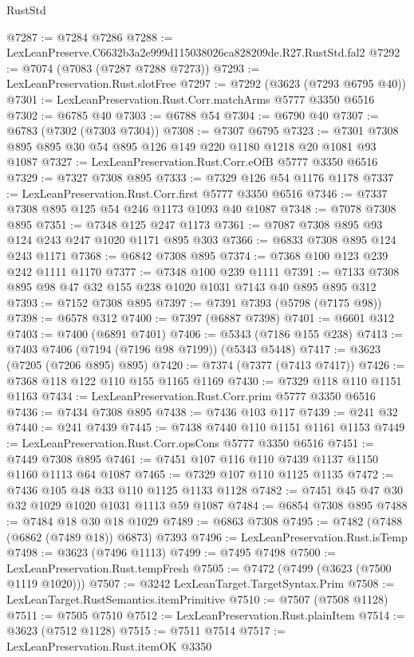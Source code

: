 \begin{lexlean}{RustStd}
\begin{coremodule}
@7287 := @7284 @7286
@7288 := LexLeanPreserve.C6632b3a2e999d115038026ca828209de.R27.RustStd.fal2
@7292 := @7074 (@7083 (@7287 @7288 @7273))
@7293 := LexLeanPreservation.Rust.slotFree
@7297 := @7292 (@3623 (@7293 @6795 @40))
@7301 := LexLeanPreservation.Rust.Corr.matchArms @5777 @3350 @6516
@7302 := @6785 @40
@7303 := @6788 @54
@7304 := @6790 @40
@7307 := @6783 (@7302 (@7303 @7304))
@7308 := @7307 @6795
@7323 := @7301 @7308 @895 @895 @30 @54 @895 @126 @149 @220 @1180 @1218 @20 @1081 @93 @1087
@7327 := LexLeanPreservation.Rust.Corr.eOfB @5777 @3350 @6516
@7329 := @7327 @7308 @895
@7333 := @7329 @126 @54 @1176 @1178
@7337 := LexLeanPreservation.Rust.Corr.first @5777 @3350 @6516
@7346 := @7337 @7308 @895 @125 @54 @246 @1173 @1093 @40 @1087
@7348 := @7078 @7308 @895
@7351 := @7348 @125 @247 @1173
@7361 := @7087 @7308 @895 @93 @124 @243 @247 @1020 @1171 @895 @303
@7366 := @6833 @7308 @895 @124 @243 @1171
@7368 := @6842 @7308 @895
@7374 := @7368 @100 @123 @239 @242 @1111 @1170
@7377 := @7348 @100 @239 @1111
@7391 := @7133 @7308 @895 @98 @47 @32 @155 @238 @1020 @1031 @7143 @40 @895 @895 @312
@7393 := @7152 @7308 @895
@7397 := @7391 @7393 (@5798 (@7175 @98))
@7398 := @6578 @312
@7400 := @7397 (@6887 @7398)
@7401 := @6601 @312
@7403 := @7400 (@6891 @7401)
@7406 := @5343 (@7186 @155 @238)
@7413 := @7403 @7406 (@7194 (@7196 @98 @7199)) (@5343 @5448)
@7417 := @3623 (@7205 (@7206 @895) @895)
@7420 := @7374 (@7377 (@7413 @7417))
@7426 := @7368 @118 @122 @110 @155 @1165 @1169
@7430 := @7329 @118 @110 @1151 @1163
@7434 := LexLeanPreservation.Rust.Corr.prim @5777 @3350 @6516
@7436 := @7434 @7308 @895
@7438 := @7436 @103 @117
@7439 := @241 @32
@7440 := @241 @7439
@7445 := @7438 @7440 @110 @1151 @1161 @1153
@7449 := LexLeanPreservation.Rust.Corr.opsCons @5777 @3350 @6516
@7451 := @7449 @7308 @895
@7461 := @7451 @107 @116 @110 @7439 @1137 @1150 @1160 @1113 @64 @1087
@7465 := @7329 @107 @110 @1125 @1135
@7472 := @7436 @105 @48 @33 @110 @1125 @1133 @1128
@7482 := @7451 @45 @47 @30 @32 @1029 @1020 @1031 @1113 @59 @1087
@7484 := @6854 @7308 @895
@7488 := @7484 @18 @30 @18 @1029
@7489 := @6863 @7308
@7495 := @7482 (@7488 (@6862 (@7489 @18)) @6873) @7393
@7496 := LexLeanPreservation.Rust.isTemp
@7498 := @3623 (@7496 @1113)
@7499 := @7495 @7498
@7500 := LexLeanPreservation.Rust.tempFresh
@7505 := @7472 (@7499 (@3623 (@7500 @1119 @1020)))
@7507 := @3242 LexLeanTarget.TargetSyntax.Prim
@7508 := LexLeanTarget.RustSemantics.itemPrimitive
@7510 := @7507 (@7508 @1128)
@7511 := @7505 @7510
@7512 := LexLeanPreservation.Rust.plainItem
@7514 := @3623 (@7512 @1128)
@7515 := @7511 @7514
@7517 := LexLeanPreservation.Rust.itemOK @3350

\end{coremodule}
\end{lexlean}
